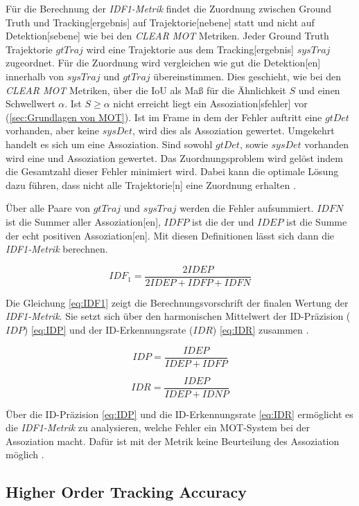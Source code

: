 Für die Berechnung der \textit{IDF1-Metrik} findet die Zuordnung zwischen \gls{Ground Truth} und \gls{Tracking}[ergebnis] auf \gls{Trajektorie}[nebene] statt und nicht auf \gls{Detektion}[sebene] wie bei den \textit{\acrshort{CLEAR} \gls{MOT}} Metriken. Jeder \gls{Ground Truth} \gls{Trajektorie} \(gtTraj\) wird eine \gls{Trajektorie} aus dem \gls{Tracking}[ergebnis] \(sysTraj\) zugeordnet. Für die Zuordnung wird vergleichen wie gut die \gls{Detektion}[en] innerhalb von \(sysTraj\) und \(gtTraj\) übereinstimmen. Dies geschieht, wie bei den \textit{\acrshort{CLEAR} \gls{MOT}} Metriken, über die \gls{IoU} als Maß für die Ähnlichkeit \(S\) und einen Schwellwert \(\alpha\). Ist \(S \geq \alpha\) nicht erreicht liegt ein \gls{Assoziation}[sfehler] vor (\ref{sec:Grundlagen von MOT}). Ist im \gls{Frame} in dem der Fehler auftritt eine \(gtDet\) vorhanden, aber keine \(sysDet\), wird dies als  \gls{Assoziation} gewertet. Umgekehrt handelt es sich um eine  \gls{Assoziation}. Sind sowohl \(gtDet\), sowie \(sysDet\) vorhanden wird eine  und  \gls{Assoziation} gewertet. Das Zuordnungsproblem wird gelöst indem die Gesamtzahl dieser Fehler minimiert wird. Dabei kann die optimale Lösung dazu führen, dass nicht alle \gls{Trajektorie}[n] eine Zuordnung erhalten \cite{IDF1}. \par

Über alle Paare von \(gtTraj\) und \(sysTraj\) werden die Fehler aufsummiert. \(IDFN\) ist die Summer aller  \gls{Assoziation}[en], \(IDFP\) ist die der  und \(IDEP\) ist die Summe der echt positiven \gls{Assoziation}[en]. Mit diesen Definitionen lässt sich dann die \textit{IDF1-Metrik} berechnen. 

\begin{equation}
    \label{eq:IDF1}
    IDF_1 = \frac{2 IDEP}{2 IDEP+IDFP+IDFN}
\end{equation}

Die Gleichung \ref{eq:IDF1} zeigt die Berechnungsvorschrift der finalen Wertung der \textit{IDF1-Metrik}. Sie setzt sich über den harmonischen Mittelwert der ID-Präzision (\(IDP\)) \ref{eq:IDP} und der ID-Erkennungsrate (\(IDR\)) \ref{eq:IDR} zusammen \cite{IDF1, Kroschel.2011}.

\begin{equation}
    \label{eq:IDP}
    IDP = \frac{IDEP}{IDEP+IDFP}
\end{equation}

\begin{equation}
    \label{eq:IDR}
    IDR = \frac{IDEP}{IDEP+IDNP}
\end{equation}

Über die ID-Präzision \ref{eq:IDP} und die ID-Erkennungsrate \ref{eq:IDR} ermöglicht es die \textit{IDF1-Metrik} zu analysieren, welche Fehler ein \gls{MOT}-System bei der \gls{Assoziation} macht. Dafür ist mit der Metrik keine Beurteilung des \gls{Assoziation} möglich \cite{IDF1, HOTA}. 

\subsection{Higher Order Tracking Accuracy}
